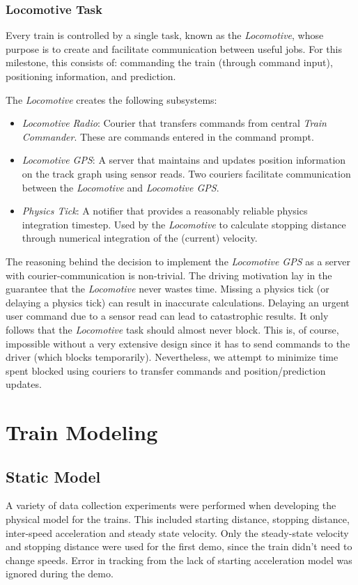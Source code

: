 \documentclass[twoside,a4paper]{refart}
\begin{document}
\subsubsection{Locomotive Task}
Every train is controlled by a single task, known as the \textit{Locomotive}, whose purpose is to create and facilitate communication between useful jobs. For this milestone, this consists of: commanding the train (through command input), positioning information, and prediction.

The \textit{Locomotive} creates the following subsystems:
\begin{itemize}
    \item{ \textit{Locomotive Radio}: Courier that transfers commands from central \textit{Train Commander}. These are commands entered in the command prompt.}
    \item{ \textit{Locomotive GPS}: A server that maintains and updates position information on the track graph using sensor reads. Two couriers facilitate communication between the \textit{Locomotive} and \textit{Locomotive GPS}. }
    \item{ \textit{Physics Tick}: A notifier that provides a reasonably reliable physics integration timestep. Used by the \textit{Locomotive} to calculate stopping distance through numerical integration of the (current) velocity. }
\end{itemize}

The reasoning behind the decision to implement the \textit{Locomotive GPS} as a server with courier-communication is non-trivial. The driving motivation lay in the guarantee that the \textit{Locomotive} never wastes time. Missing a physics tick (or delaying a physics tick) can result in inaccurate calculations. Delaying an urgent user command due to a sensor read can lead to catastrophic results. It only follows that the \textit{Locomotive} task should almost never block. This is, of course, impossible without a very extensive design since it has to send commands to the driver (which blocks temporarily). Nevertheless, we attempt to minimize time spent blocked using couriers to transfer commands and position/prediction updates.

\section{Train Modeling}

\subsection{Static Model}
A variety of data collection experiments were performed when developing the physical model for the trains. This included starting distance, stopping distance, inter-speed acceleration and steady state velocity. Only the steady-state velocity and stopping distance were used for the first demo, since the train didn't need to change speeds. Error in tracking from the lack of starting acceleration model was ignored during the demo.
\end{document}

